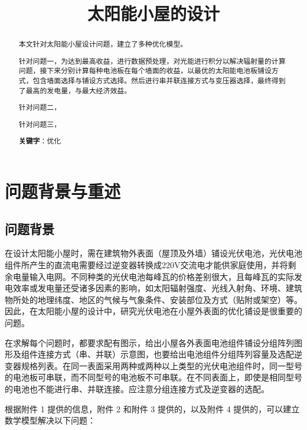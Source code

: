 \documentclass{ctexart}
\title{太阳能小屋的设计}
\date{}
\author{}
\begin{document}
    \maketitle
    \renewcommand{\abstractname}{\Large 摘要\\}
    \begin{abstract}
        \normalsize
        本文针对太阳能小屋设计问题，建立了多种优化模型。
        
        针对问题一，为达到最高收益，进行数据预处理，对光能进行积分以解决辐射量的计算问题，接下来分别计算每种电池板在每个墙面的收益，以最优的太阳能电池板铺设方式，包含墙面选择与铺设方式选择。然后进行串并联连接方式与变压器选择，最终得到了最高的发电量，与最大经济效益。
        
        针对问题二，
        
        针对问题三，
        
        \textbf{关键字}：优化
    \end{abstract}
    \newpage
	\section{问题背景与重述}
	\subsection{问题背景}
    在设计太阳能小屋时，需在建筑物外表面（屋顶及外墙）铺设光伏电池，光伏电池组件所产生的直流电需要经过逆变器转换成220V交流电才能供家庭使用，并将剩余电量输入电网。不同种类的光伏电池每峰瓦的价格差别很大，且每峰瓦的实际发电效率或发电量还受诸多因素的影响，如太阳辐射强度、光线入射角、环境、建筑物所处的地理纬度、地区的气候与气象条件、安装部位及方式（贴附或架空）等。因此，在太阳能小屋的设计中，研究光伏电池在小屋外表面的优化铺设是很重要的问题。
    
    在求解每个问题时，都要求配有图示，给出小屋各外表面电池组件铺设分组阵列图形及组件连接方式（串、并联）示意图，也要给出电池组件分组阵列容量及选配逆变器规格列表。在同一表面采用两种或两种以上类型的光伏电池组件时，同一型号的电池板可串联，而不同型号的电池板不可串联。在不同表面上，即使是相同型号的电池也不能进行串、并联连接。应注意分组连接方式及逆变器的选配。
    
    根据附件 1 提供的信息，附件 2 和附件 3 提供的，以及附件 4 提供的，可以建立数学模型解决以下问题：
    
\end{document}
